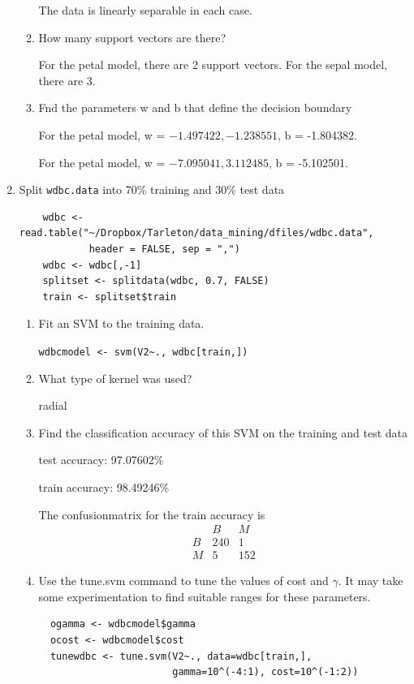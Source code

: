 \documentclass[11pt]{article}
\begin{document}
\begin{enumerate}
\begin{enumerate}
The data is linearly separable in each case.  

\item How many support vectors are there? 

For the petal model, there are 2 support vectors. For the sepal model, there are 3. 

\item Fnd the parameters w and b that define the decision boundary

For the  petal model, w = $    -1.497422,   -1.238551$, b = -1.804382.

For the  petal model, w = $    -7.095041,    3.112485$, b = -5.102501.

%
%
  \end{enumerate}
  \item Split \verb|wdbc.data| into 70\% training and 30\% test data
  
    \begin{Verbatim}
    wdbc <- read.table("~/Dropbox/Tarleton/data_mining/dfiles/wdbc.data", 
            header = FALSE, sep = ",")
    wdbc <- wdbc[,-1]
    splitset <- splitdata(wdbc, 0.7, FALSE)
    train <- splitset$train
    \end{Verbatim}
  
  \begin{enumerate}
  \item Fit an SVM to the training data.
  
  \verb|wdbcmodel <- svm(V2~., wdbc[train,])|
  
  \item What type of kernel was used? 
  
  radial
  
  \item Find the classification accuracy of this SVM on the training and test data
  
  test accuracy: 97.07602\%
  
  train accuracy: 98.49246\%
  
  The confusionmatrix for the train accuracy is 
  $$
  \begin{matrix}
   & B &   M \\
   B & 240 &   1\\
   M &   5 & 152
  \end{matrix}
  $$
  
  \item Use the tune.svm command to tune the values of cost and $\gamma$. It may 
   take some experimentation to find suitable ranges for these parameters. 
  \begin{Verbatim}
  ogamma <- wdbcmodel$gamma
  ocost <- wdbcmodel$cost
  tunewdbc <- tune.svm(V2~., data=wdbc[train,], 
                       gamma=10^(-4:1), cost=10^(-1:2))
  

\end{Verbatim}
\end{enumerate}
\end{enumerate}
\end{document}
